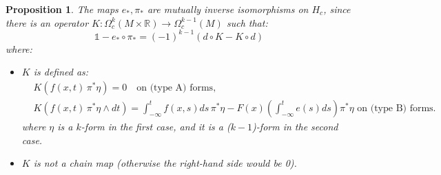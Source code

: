 \documentclass[a4paper,11pt,titlepage, article, oneside]{memoir}
\numberwithin{equation}{section}
\newtheorem{proposition}[theorem]{Proposition}
\theoremstyle{definition}
\theoremstyle{remark}
\newcommand{\rfield}{\mathbb{R}}
\begin{document}
\begin{proposition} \label{kprop}
The maps $e_*, \pi_*$ are mutually inverse isomorphisms on $H_c$, since there is an operator $K \colon \Omega^k_c(M \times \rfield) \rightarrow \Omega_c^{k-1}(M)$ such that:
\begin{equation}
\mathbb{1} - e_* \circ \pi_* = (-1)^{k-1} (d \circ K - K \circ d)
\end{equation}
where:
\begin{itemize}
\item $K$ is defined as:
\begin{align}
&K(f(x, t)\, \pi^*\eta) = 0 \quad \text{on (type A) forms,} \\
&K(f(x, t)\, \pi^* \eta \wedge dt) = \int_{-\infty}^t f(x, s) ds\, \pi^* \eta - F(x) \left ( \int_{-\infty}^t e(s)ds \right) \pi^* \eta \, \, \text{on (type B) forms.}
\end{align}
where $\eta$ is a $k$-form in the first case, and it is a ($k-1$)-form in the second case.
\item $K$ is not a chain map (otherwise the right-hand side would be 0).
\end{itemize}
\end{proposition}
\end{document}
